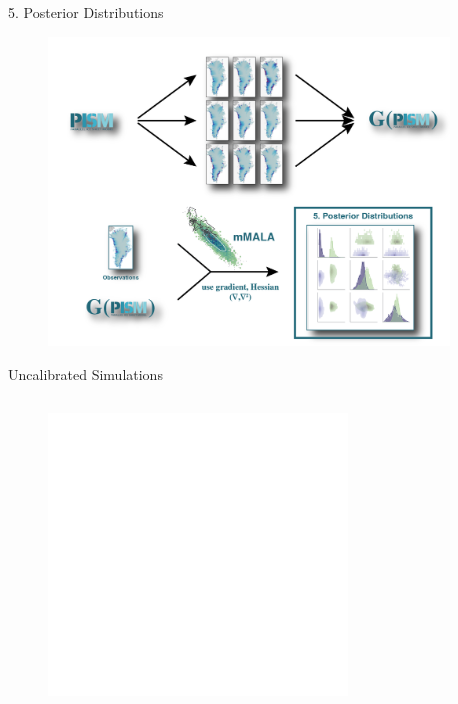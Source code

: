 \documentclass[aspectratio=169,hide notes,intlimits]{beamer}
\begin{document}
\begin{frame}{5. Posterior Distributions}
  \vspace{-1.5em}
    \begin{minipage}[t][8.2cm][t]{\textwidth}
    \begin{figure}
      \includegraphics[height=8.2cm]{surrogate_model_5}
    \end{figure}
    \end{minipage}
\end{frame}

\begin{frame}{Uncalibrated Simulations}
\begin{columns}[c]
    \begin{column}{.5\textwidth}
      \begin{figure}
        \includegraphics<1>[height=7.5cm]{sle_pdf_w_obs_as19_2020.pdf}
    \end{figure}
    \end{column}
    \begin{column}{.5\textwidth}
    \end{column}
  \end{columns}

\end{frame}
\end{document}

